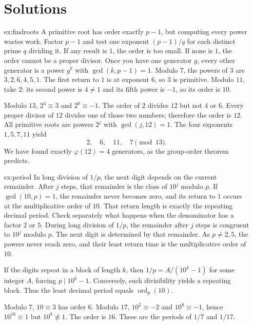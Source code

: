\section{Solutions}

\begin{solution}{ex:findroots}
\idea A primitive root has order exactly $p-1$, but computing every power wastes work. Factor $p-1$ and test one exponent $(p-1)/q$ for each distinct prime $q$ dividing it. If any result is $1$, the order is too small. If none is $1$, the order cannot be a proper divisor. Once you have one generator $g$, every other generator is a power $g^k$ with $\gcd(k,p-1)=1$.
\writeup Modulo $7$, the powers of $3$ are $3,2,6,4,5,1$. The first return to $1$ is at exponent $6$, so $3$ is primitive. Modulo $11$, take $2$: its second power is $4\ne1$ and its fifth power is $-1$, so its order is $10$.

Modulo $13$, $2^4\equiv3$ and $2^6\equiv-1$. The order of $2$ divides $12$ but not $4$ or $6$. Every proper divisor of $12$ divides one of those two numbers; therefore the order is $12$. All primitive roots are powers $2^j$ with $\gcd(j,12)=1$. The four exponents $1,5,7,11$ yield
\[
2,\quad6,\quad11,\quad7\pmod{13}.
\]
We have found exactly $\varphi(12)=4$ generators, as the group-order theorem predicts.
\end{solution}

\begin{solution}{ex:period}
\idea In long division of $1/p$, the next digit depends on the current remainder. After $j$ steps, that remainder is the class of $10^j$ modulo $p$. If $\gcd(10,p)=1$, the remainder never becomes zero, and its return to $1$ occurs at the multiplicative order of $10$. That return length is exactly the repeating decimal period. Check separately what happens when the denominator has a factor $2$ or $5$.
\writeup During long division of $1/p$, the remainder after $j$ steps is congruent to $10^j$ modulo $p$. The next digit is determined by that remainder. As $p\ne2,5$, the powers never reach zero, and their least return time is the multiplicative order of $10$.

If the digits repeat in a block of length $k$, then $1/p=A/(10^k-1)$ for some integer $A$, forcing $p\mid10^k-1$. Conversely, such divisibility yields a repeating block. Thus the least decimal period equals $\operatorname{ord}_p(10)$.

Modulo $7$, $10\equiv3$ has order $6$. Modulo $17$, $10^2\equiv-2$ and $10^8\equiv-1$, hence $10^{16}\equiv1$ but $10^8\not\equiv1$. The order is $16$. These are the periods of $1/7$ and $1/17$.
\end{solution}

